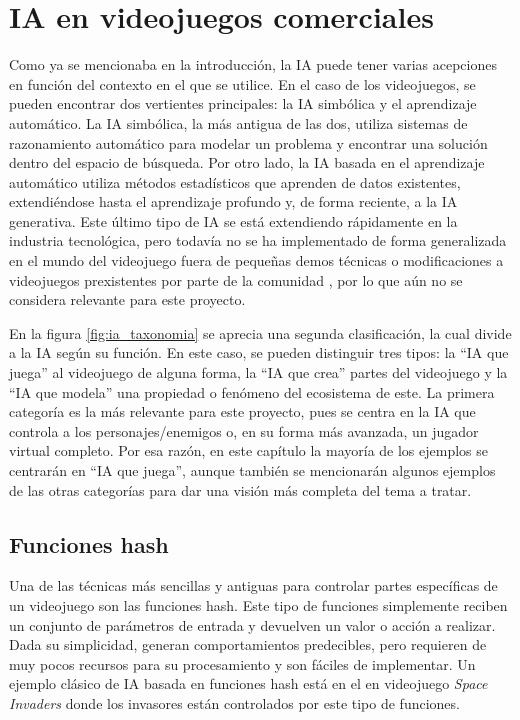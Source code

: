 \section{IA en videojuegos comerciales} \label{sec:ia_videojuegos}

Como ya se mencionaba en la introducción, la IA puede tener varias acepciones en función del contexto en el que se utilice. En el caso de los videojuegos, se pueden encontrar dos vertientes principales: la IA simbólica y el aprendizaje automático. La IA simbólica, la más antigua de las dos, utiliza sistemas de razonamiento automático para modelar un problema y encontrar una solución dentro del espacio de búsqueda. Por otro lado, la IA basada en el aprendizaje automático utiliza métodos estadísticos que aprenden de datos existentes, extendiéndose hasta el aprendizaje profundo y, de forma reciente, a la IA generativa. Este último tipo de IA se está extendiendo rápidamente en la industria tecnológica, pero todavía no se ha implementado de forma generalizada en el mundo del videojuego fuera de pequeñas demos técnicas o modificaciones a videojuegos prexistentes por parte de la comunidad \cite{thompson_how_2025}, por lo que aún no se considera relevante para este proyecto.

En la figura \ref{fig:ia_taxonomia} se aprecia una segunda clasificación, la cual divide a la IA según su función. En este caso, se pueden distinguir tres tipos: la ``IA que juega'' al videojuego de alguna forma, la ``IA que crea'' partes del videojuego y la ``IA que modela'' una propiedad o fenómeno del ecosistema de este. La primera categoría es la más relevante para este proyecto, pues se centra en la IA que controla a los personajes/enemigos o, en su forma más avanzada, un jugador virtual completo. Por esa razón, en este capítulo la mayoría de los ejemplos se centrarán en ``IA que juega'', aunque también se mencionarán algunos ejemplos de las otras categorías para dar una visión más completa del tema a tratar.

\subsection{Funciones hash}

Una de las técnicas más sencillas y antiguas para controlar partes específicas de un videojuego son las funciones hash. Este tipo de funciones simplemente reciben un conjunto de parámetros de entrada y devuelven un valor o acción a realizar. Dada su simplicidad, generan comportamientos predecibles, pero requieren de muy pocos recursos para su procesamiento y son fáciles de implementar. Un ejemplo clásico de IA basada en funciones hash está en el en videojuego \textit{Space Invaders} \cite{wikipedia_artificial_2025} donde los invasores están controlados por este tipo de funciones.

